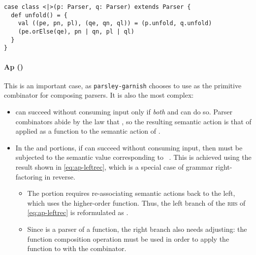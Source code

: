 \documentclass[../../main.tex]{subfiles}
\begin{document}
\begin{verbatim}
case class <|>(p: Parser, q: Parser) extends Parser {
  def unfold() = {
    val ((pe, pn, pl), (qe, qn, ql)) = (p.unfold, q.unfold)
    (pe.orElse(qe), pn | qn, pl | ql)
  }
}
\end{verbatim}

\paragraph{Ap (\scala{<*>})}
This is an important case, as \texttt{parsley-garnish} chooses to use \scala{<*>} as the primitive combinator for composing parsers.
It is also the most complex:
\begin{itemize}
  \item {} can succeed without consuming input only if \emph{both}  and  can do so. Parser combinators abide by the law that , so the resulting semantic action is that of  applied as a function to the semantic action of .
  \item In the  and  portions, if  can succeed without consuming input, then  must be subjected to the semantic value corresponding to ~\cite{swierstra_deterministic_1996}. This is achieved using the result shown in \cref{eq:ap-leftrec}, which is a special case of grammar right-factoring in reverse.
  \begin{itemize}
    \item The  portion requires re-associating semantic actions back to the left, which uses the  higher-order function. Thus, the left branch of the \textsc{rhs} of \cref{eq:ap-leftrec} is reformulated as .
    \item Since  is a parser of a function, the right branch also needs adjusting: the function composition operation must be used in order to apply the function to  with the \scala{<*>} combinator.
  \end{itemize}
\end{itemize}
\end{document}
